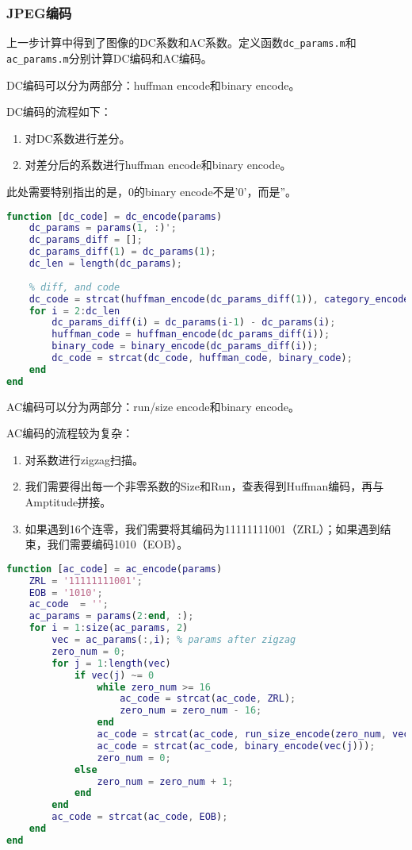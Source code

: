 \documentclass[a4paper]{article}
\begin{document}
\subsubsection{JPEG编码}
\par 上一步计算中得到了图像的DC系数和AC系数。定义函数\lstinline{dc_params.m}和\lstinline{ac_params.m}分别计算DC编码和AC编码。
\par DC编码可以分为两部分：huffman encode和binary encode。
\par DC编码的流程如下：
\begin{enumerate}
    \item 对DC系数进行差分。
    \item 对差分后的系数进行huffman encode和binary encode。
\end{enumerate}
\par 此处需要特别指出的是，0的binary encode不是'0'，而是''。
\begin{lstlisting}[language=matlab, caption=DC code]
function [dc_code] = dc_encode(params)
    dc_params = params(1, :)';
    dc_params_diff = [];
    dc_params_diff(1) = dc_params(1);
    dc_len = length(dc_params);
    
    % diff, and code
    dc_code = strcat(huffman_encode(dc_params_diff(1)), category_encode(dc_params_diff(1)));
    for i = 2:dc_len
        dc_params_diff(i) = dc_params(i-1) - dc_params(i);
        huffman_code = huffman_encode(dc_params_diff(i));
        binary_code = binary_encode(dc_params_diff(i));
        dc_code = strcat(dc_code, huffman_code, binary_code);
    end
end
\end{lstlisting}

\par AC编码可以分为两部分：run/size encode和binary encode。
\par AC编码的流程较为复杂：
\begin{enumerate}
    \item 对系数进行zigzag扫描。
    \item 我们需要得出每一个非零系数的Size和Run，查表得到Huffman编码，再与Amptitude拼接。
    \item 如果遇到16个连零，我们需要将其编码为11111111001（ZRL）；如果遇到结束，我们需要编码1010（EOB）。
\end{enumerate}

\begin{lstlisting}[language=matlab, caption=AC code]
function [ac_code] = ac_encode(params)
    ZRL = '11111111001';
    EOB = '1010';
    ac_code  = '';
    ac_params = params(2:end, :);
    for i = 1:size(ac_params, 2)
        vec = ac_params(:,i); % params after zigzag
        zero_num = 0;
        for j = 1:length(vec)
            if vec(j) ~= 0
                while zero_num >= 16
                    ac_code = strcat(ac_code, ZRL);
                    zero_num = zero_num - 16;
                end
                ac_code = strcat(ac_code, run_size_encode(zero_num, vec(j)));
                ac_code = strcat(ac_code, binary_encode(vec(j)));
                zero_num = 0;
            else
                zero_num = zero_num + 1;
            end
        end
        ac_code = strcat(ac_code, EOB); 
    end
end
\end{lstlisting}
\end{document}
